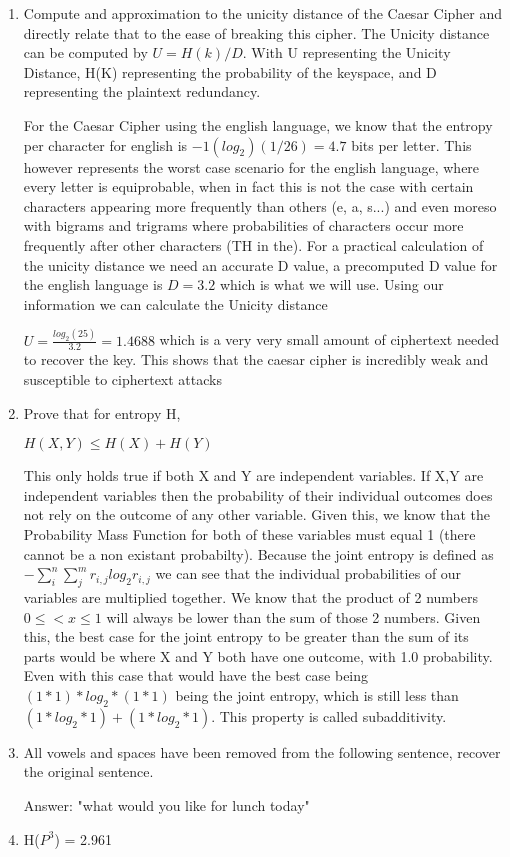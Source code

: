 \documentclass[12pt]{article}
\begin{document}
\begin{enumerate}
  \item Compute and approximation to the unicity distance of the Caesar Cipher and directly relate that to the ease of breaking this cipher.
    The Unicity distance can be computed by $U = H(k)/D$. With U representing the Unicity Distance, H(K) representing the probability of the keyspace, and D representing the plaintext redundancy. 
    \par For the Caesar Cipher using the english language, we know that the entropy per character for english is $-1(log_2)(1/26) = 4.7$ bits per letter.  This however represents the worst case scenario for the english language, where every letter is equiprobable, when in fact this is not the case with certain characters appearing more frequently than others (e, a, s...) and even moreso with bigrams and trigrams where probabilities of characters occur more frequently after other characters (TH in the).  For a practical calculation of the unicity distance we need an accurate D value, a precomputed D value for the english language is $D=3.2$ which is what we will use.  Using our information we can calculate the Unicity distance\par $U=\frac{log_2(25)}{3.2} = 1.4688$ which is a very very small amount of ciphertext needed to recover the key.  This shows that the caesar cipher is incredibly weak and susceptible to ciphertext attacks


  \item Prove that for entropy H, \par $H(X,Y) \le H(X) + H(Y)$
    \par This only holds true if both X and Y are independent variables.  If X,Y are independent variables then the probability of their individual outcomes does not rely on the outcome of any other variable.  Given this, we know that the Probability Mass Function for both of these variables must equal 1 (there cannot be a non existant probabilty).  Because the
    joint entropy is defined as $-\sum_{i}^n\sum_{j}^mr_{i,j}log_2r_{i,j}$ we can see that the individual probabilities of our variables are multiplied together.  We know that the product of 2 numbers $0 \le < x \le 1 $ will always be lower than the sum of those 2 numbers.  Given this, the best case for the joint entropy to be greater than the sum of its parts would be where
    X and Y both have one outcome, with 1.0 probability.  Even with this case that would have the best case being $(1*1) * log_2 * (1 * 1)$ being the joint entropy, which is still less than $(1 * log_2 * 1) + (1*log_2*1)$.  This property is called subadditivity.
  \item All vowels and spaces have been removed from the following sentence, recover the original sentence.\par Answer: "what would you like for lunch today"
  \item H($P^3$) = 2.961

\end{enumerate}
\end{document}
